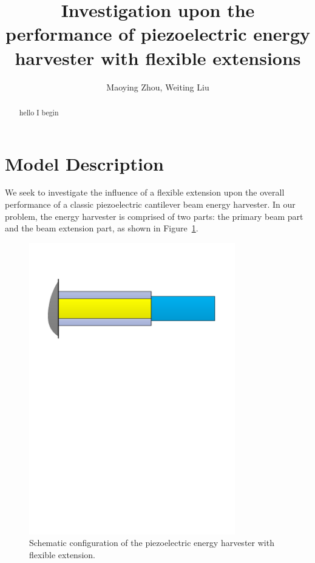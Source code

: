 \documentclass{elsarticle}
\begin{document}
\title{Investigation upon the performance of piezoelectric energy harvester with flexible extensions}
\author{Maoying Zhou, Weiting Liu}
\maketitle


\begin{abstract}
    hello I begin
\end{abstract}

\section{Model Description}

We seek to investigate the influence of a flexible extension upon the overall performance of a classic piezoelectric cantilever beam energy harvester. In our problem, the energy harvester is comprised of two parts: the primary beam part and the beam extension part, as shown in Figure~\ref{fig:fig_beam_configuration}.
\begin{figure}[!htbp]
    \centering
    \includegraphics[width=0.8\textwidth]{./fig_beam_configuration.pdf}
    \caption{Schematic configuration of the piezoelectric energy harvester with flexible extension.}
    \label{fig:fig_beam_configuration}
\end{figure}
\end{document}
